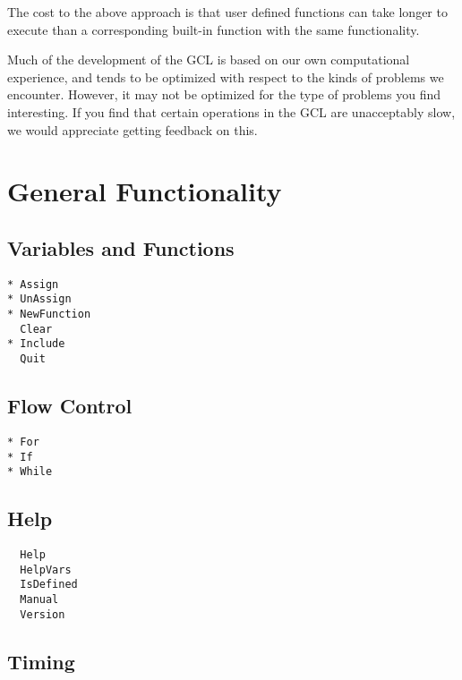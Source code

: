 The cost to the above approach is that user defined functions can take
longer to execute than a corresponding built-in function with the same
functionality.

Much of the development of the GCL is based on our own computational
experience, and tends to be optimized with respect to the kinds of
problems we encounter.  However, it may not be optimized
for the type of problems you find interesting.  If you find that
certain operations in the GCL are unacceptably slow, we would
appreciate getting feedback on this.

\section{General Functionality}

\subsection{Variables and Functions}

\begin{multicols}{3}
\begin{verbatim}
* Assign 
* UnAssign 
* NewFunction
  Clear 
* Include
  Quit
\end{verbatim}
\end{multicols}

\subsection{Flow Control}

\begin{multicols}{3}
\begin{verbatim}
* For
* If
* While
\end{verbatim}
\end{multicols}

\subsection{Help}

\begin{multicols}{3}
\begin{verbatim}
  Help 
  HelpVars 
  IsDefined
  Manual 
  Version 
\end{verbatim}
\end{multicols}


\subsection{Timing}

